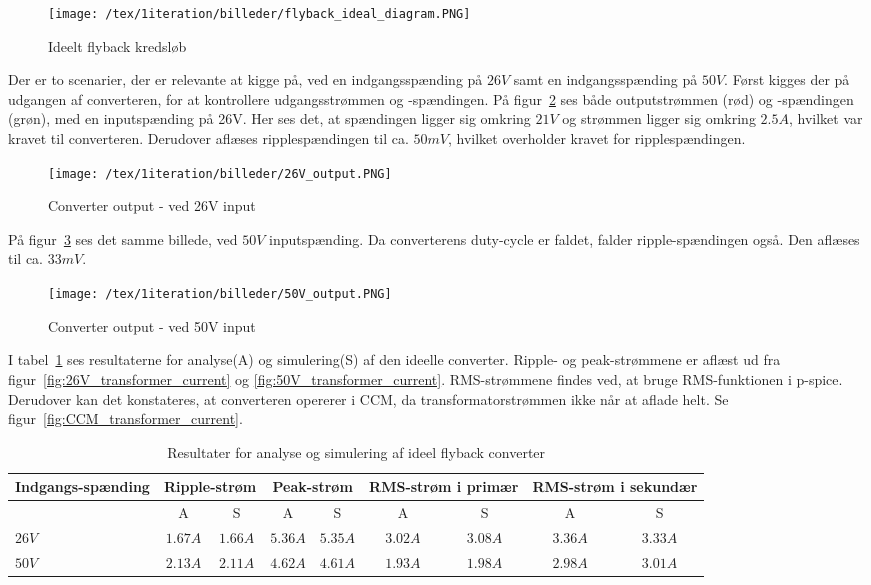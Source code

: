 \begin{figure}[H]
	\center
	\texttt{[image: /tex/1iteration/billeder/flyback\_ideal\_diagram.PNG]}
	\caption{Ideelt flyback kredsløb}
	\label{fig:ideal_flyback_diagram}
\end{figure}

\noindent Der er to scenarier, der er relevante at kigge på, ved en indgangsspænding på $26V$ samt en indgangsspænding på $50V$. Først kigges der på udgangen af converteren, for at kontrollere udgangsstrømmen og -spændingen. På figur~\ref{fig:26V_ideal_output} ses både outputstrømmen (rød) og -spændingen (grøn), med en inputspænding på 26V. Her ses det, at spændingen ligger sig omkring $21V$ og strømmen ligger sig omkring $2.5A$, hvilket var kravet til converteren. Derudover aflæses ripplespændingen til ca. $50mV$, hvilket overholder kravet for ripplespændingen. 

\begin{figure}[H]
	\center
	\texttt{[image: /tex/1iteration/billeder/26V\_output.PNG]}
	\caption{Converter output - ved 26V input}
	\label{fig:26V_ideal_output}
\end{figure}

\noindent På figur~\ref{fig:50V_ideal_output} ses det samme billede, ved $50V$ inputspænding. Da converterens duty-cycle er faldet, falder ripple-spændingen også. Den aflæses til ca. $33mV$. 


\begin{figure}[H]
	\center
	\texttt{[image: /tex/1iteration/billeder/50V\_output.PNG]}
	\caption{Converter output - ved 50V input}
	\label{fig:50V_ideal_output}
\end{figure}

\noindent I tabel~\ref{tab:result_ideal_converter} ses resultaterne for analyse(A) og simulering(S) af den ideelle converter. Ripple- og peak-strømmene er aflæst ud fra figur~\ref{fig:26V_transformer_current} og \ref{fig:50V_transformer_current}. RMS-strømmene findes ved, at bruge RMS-funktionen i p-spice. Derudover kan det konstateres, at converteren opererer i CCM, da transformatorstrømmen ikke når at aflade helt. Se figur~\ref{fig:CCM_transformer_current}. 

\begin{table}[H] 			
	\centering
	\begin{tabularx}{\textwidth}{|X|c|c|c|c|c|c|c|c|}
		\hline
		\textbf{Indgangs-spænding} & \multicolumn{2}{|X|}{\textbf{Ripple-strøm}} & \multicolumn{2}{|X|}{\textbf{Peak-strøm}} & \multicolumn{2}{|X|}{\textbf{RMS-strøm i primær}} & \multicolumn{2}{|X|}{\textbf{RMS-strøm i sekundær}} \\ \hline
		& A & S & A & S & A & S & A & S \\ \hline
		$26V$ & $1.67A$ & $1.66A$ & $5.36A$ & $5.35A$ & $3.02A$ & $3.08A$ & $3.36A$ & $3.33A$ \\ \hline 
		$50V$ & $2.13A$ & $2.11A$ & $4.62A$ & $4.61A$ & $1.93A$ & $1.98A$ & $2.98A$ & $3.01A$ \\ \hline
	\end{tabularx}
	\caption{Resultater for analyse og simulering af ideel flyback converter}
	\label{tab:result_ideal_converter}
\end{table}


